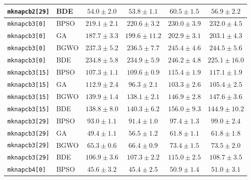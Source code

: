\documentclass[journal,article,submit,moreauthors]{Definitions/mdpi}
\begin{document}
\begin{longtable}{llcccc}
    \texttt{mknapcb2[29]} & BDE   &           $54.0 \pm 2.0$ &  $\mathbf{53.8 \pm 1.1}$ &           $60.5 \pm 1.5$ &           $56.9 \pm 2.2$ \\
    \midrule
    \texttt{mknapcb3[0]} & BPSO  & $\mathbf{219.1 \pm 2.1}$ &          $220.6 \pm 3.2$ &          $230.0 \pm 3.9$ &          $232.0 \pm 4.5$ \\
    \texttt{mknapcb3[0]} & GA    & $\mathbf{187.7 \pm 3.3}$ &         $199.6 \pm 11.2$ &          $202.9 \pm 3.1$ &          $203.1 \pm 4.3$ \\
    \texttt{mknapcb3[0]} & BGWO  &          $237.3 \pm 5.2$ & $\mathbf{236.5 \pm 7.7}$ &          $245.4 \pm 4.6$ &          $244.5 \pm 5.6$ \\
    \texttt{mknapcb3[0]} & BDE   &          $234.8 \pm 5.8$ &          $234.9 \pm 5.9$ &          $246.2 \pm 4.8$ & $\mathbf{225.1 \pm 16.0}$ \\
    \midrule
    \texttt{mknapcb3[15]} & BPSO  & $\mathbf{107.3 \pm 1.1}$ &          $109.6 \pm 0.9$ &          $115.4 \pm 1.9$ &          $117.1 \pm 1.9$ \\
    \texttt{mknapcb3[15]} & GA    &          $112.9 \pm 2.4$ &  $\mathbf{96.3 \pm 2.1}$ &          $103.3 \pm 2.6$ &          $105.4 \pm 2.5$ \\
    \texttt{mknapcb3[15]} & BGWO  &          $139.9 \pm 1.4$ & $\mathbf{138.1 \pm 2.1}$ &          $146.9 \pm 2.8$ &          $147.6 \pm 3.6$ \\
    \texttt{mknapcb3[15]} & BDE   & $\mathbf{138.8 \pm 8.0}$ &          $140.3 \pm 6.2$ &          $156.0 \pm 9.3$ &         $144.9 \pm 10.2$ \\
    \midrule
    \texttt{mknapcb3[29]} & BPSO  &           $93.0 \pm 1.1$ &  $\mathbf{91.4 \pm 1.0}$ &           $97.4 \pm 1.3$ &           $99.0 \pm 2.4$ \\
    \texttt{mknapcb3[29]} & GA    &  $\mathbf{49.4 \pm 1.1}$ &           $56.5 \pm 1.2$ &           $61.8 \pm 1.1$ &           $61.8 \pm 1.8$ \\
    \texttt{mknapcb3[29]} & BGWO  &  $\mathbf{65.3 \pm 0.6}$ &           $66.4 \pm 0.9$ &           $73.4 \pm 1.5$ &           $73.5 \pm 2.0$ \\
    \texttt{mknapcb3[29]} & BDE   & $\mathbf{106.9 \pm 3.6}$ &          $107.3 \pm 2.2$ &          $115.0 \pm 2.5$ &          $108.7 \pm 3.5$ \\
    \midrule
    \texttt{mknapcb4[0]} & BPSO  &           $45.6 \pm 3.2$ &  $\mathbf{45.4 \pm 2.5}$ &           $50.9 \pm 1.4$ &           $51.0 \pm 3.1$ \\

\end{longtable}
\end{document}
